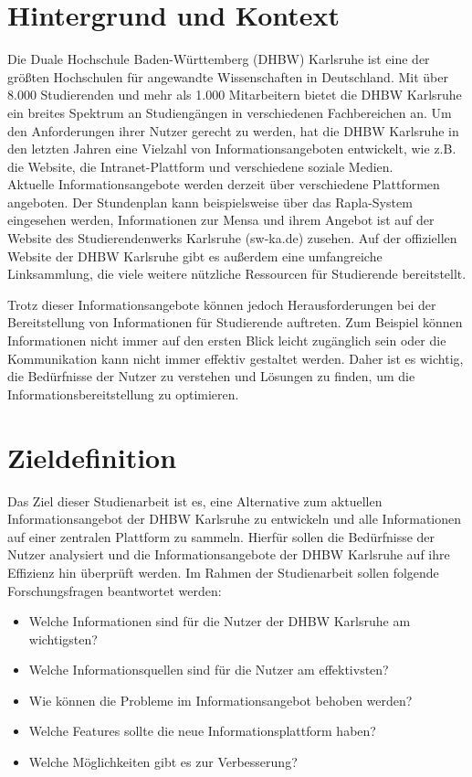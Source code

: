 \section{Hintergrund und Kontext}
Die Duale Hochschule Baden-Württemberg (DHBW) Karlsruhe ist eine der größten Hochschulen für angewandte Wissenschaften in Deutschland. Mit über 8.000 Studierenden und mehr als 1.000 Mitarbeitern bietet die DHBW Karlsruhe ein breites Spektrum an Studiengängen in verschiedenen Fachbereichen an. Um den Anforderungen ihrer Nutzer gerecht zu werden, hat die DHBW Karlsruhe in den letzten Jahren eine Vielzahl von Informationsangeboten entwickelt, wie z.B. die Website, die Intranet-Plattform und verschiedene soziale Medien.\\
Aktuelle Informationsangebote werden derzeit über verschiedene Plattformen angeboten. Der Stundenplan kann beispielsweise über das Rapla-System eingesehen werden, Informationen zur Mensa und ihrem Angebot ist auf der Website des Studierendenwerks Karlsruhe (sw-ka.de) zusehen. Auf der offiziellen Website der DHBW Karlsruhe gibt es außerdem eine umfangreiche Linksammlung, die viele weitere nützliche Ressourcen für Studierende bereitstellt.

Trotz dieser Informationsangebote können jedoch Herausforderungen bei der Bereitstellung von Informationen für Studierende auftreten. Zum Beispiel können Informationen nicht immer auf den ersten Blick leicht zugänglich sein oder die Kommunikation kann nicht immer effektiv gestaltet werden. Daher ist es wichtig, die Bedürfnisse der Nutzer zu verstehen und Lösungen zu finden, um die Informationsbereitstellung zu optimieren.


\section{Zieldefinition}
Das Ziel dieser Studienarbeit ist es, eine Alternative zum aktuellen Informationsangebot der DHBW Karlsruhe zu entwickeln und alle Informationen auf einer zentralen Plattform zu sammeln. Hierfür sollen die Bedürfnisse der Nutzer analysiert und die Informationsangebote der DHBW Karlsruhe auf ihre Effizienz hin überprüft werden.
Im Rahmen der Studienarbeit sollen folgende Forschungsfragen beantwortet werden:
\begin{itemize}
	\item Welche Informationen sind für die Nutzer der DHBW Karlsruhe am wichtigsten?
	\item Welche Informationsquellen sind für die Nutzer am effektivsten?
	\item Wie können die Probleme im Informationsangebot behoben werden?
	\item Welche Features sollte die neue Informationsplattform haben?
	\item Welche Möglichkeiten gibt es zur Verbesserung?
\end{itemize}
\newpage
